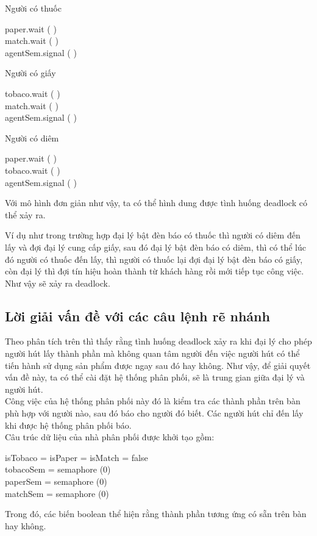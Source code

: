 \documentclass[a4paper]{article}
\begin{document}
	\begin{center}
		Người có thuốc
		\begin{tcolorbox}
		paper.wait ( ) \\
		match.wait ( ) \\ 
		agentSem.signal ( ) 
		\end{tcolorbox}
	\end{center}
	\begin{center}
		Người có giấy
		\begin{tcolorbox}
		tobaco.wait ( ) \\
		match.wait ( ) \\ 
		agentSem.signal ( ) 
		\end{tcolorbox}
	\end{center}
	\begin{center}
		Người có diêm
		\begin{tcolorbox}
		paper.wait ( ) \\
		tobaco.wait ( ) \\ 
		agentSem.signal ( ) 
		\end{tcolorbox}
	\end{center}
	
	
	Với mô hình đơn giản như vậy, ta có thể hình dung được tình huống deadlock có thể xảy ra. 
	
	
	Ví dụ như trong trường hợp đại lý bật đèn báo có thuốc thì người có diêm đến lấy và đợi đại lý 
	cung cấp giấy, sau đó đại lý bật đèn báo có diêm, thì có thể lúc đó người có thuốc đến lấy,
	thì người có thuốc lại đợi đại lý bật đèn báo có giấy, còn đại lý thì đợi tín hiệu hoàn thành từ 
	khách hàng rồi mới tiếp tục công việc. Như vậy sẽ xảy ra deadlock.
	\subsection{Lời giải vấn đề với các câu lệnh rẽ nhánh}
	Theo phân tích trên thì thấy rằng tình huống deadlock xảy ra khi đại lý cho phép người hút
	lấy thành phần mà không quan tâm người đến việc người hút có thể tiến hành sử dụng sản phẩm được ngay sau 
	đó hay không. Như vậy, để giải quyết vấn đề này, 
	ta có thể cài đặt hệ thống phân phối, sẽ là trung gian giữa đại lý và người hút. \\
	Công việc của hệ thống phân phối này đó là kiểm tra các thành phần trên bàn phù hợp với người 
	nào, sau đó báo cho người đó biết. Các người hút chỉ đến lấy khi được hệ thống phân phối báo. \\
	Câu trúc dữ liệu của nhà phân phối được khởi tạo gồm: 
	\begin{tcolorbox}
	isTobaco = isPaper = isMatch = false \\
	tobacoSem = semaphore (0) \\
	paperSem = semaphore (0) \\
	matchSem = semaphore (0)
	\end{tcolorbox}
	Trong đó, các biến boolean thể hiện rằng thành phần tương ứng có sẵn trên bàn hay không. 
	
\end{document}
